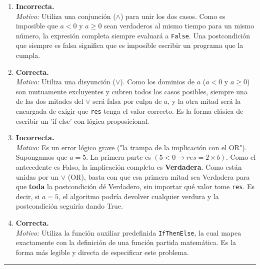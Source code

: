 \begin{enumerate}[label=\textbf{\alph*)}]

    \item \textbf{Incorrecta.} \\
    \textit{Motivo:} Utiliza una conjunción (\texttt{$\wedge$}) para unir los dos casos. Como es imposible que $a < 0$ y $a \geq 0$ sean verdaderos al mismo tiempo para un mismo número, la expresión completa siempre evaluará a \texttt{False}. Una postcondición que siempre es falsa significa que es imposible escribir un programa que la cumpla.

    \vspace{0.4cm}
    \item \textbf{Correcta.} \\
    \textit{Motivo:} Utiliza una disyunción (\texttt{$\vee$}). Como los dominios de $a$ ($a < 0$ y $a \geq 0$) son mutuamente excluyentes y cubren todos los casos posibles, siempre una de las dos mitades del \texttt{$\vee$} será falsa por culpa de $a$, y la otra mitad será la encargada de exigir que \texttt{res} tenga el valor correcto. Es la forma clásica de escribir un 'if-else' con lógica proposicional.

    \vspace{0.4cm}
    \item \textbf{Incorrecta.} \\
    \textit{Motivo:} Es un error lógico grave ("la trampa de la implicación con el OR"). Supongamos que $a = 5$. La primera parte es $(5 < 0 \rightarrow res = 2 \times b)$. Como el antecedente es Falso, la implicación completa es \textbf{Verdadera}. Como están unidas por un \texttt{$\vee$} (OR), basta con que esa primera mitad sea Verdadera para que \textbf{toda} la postcondición dé Verdadero, sin importar qué valor tome \texttt{res}. Es decir, si $a=5$, el algoritmo podría devolver cualquier verdura y la postcondición seguiría dando True.

    \vspace{0.4cm}
    \item \textbf{Correcta.} \\
    \textit{Motivo:} Utiliza la función auxiliar predefinida \texttt{IfThenElse}, la cual mapea exactamente con la definición de una función partida matemática. Es la forma más legible y directa de especificar este problema.

\end{enumerate}

\vspace{0.5cm}
\hrule
\vspace{0.5cm}